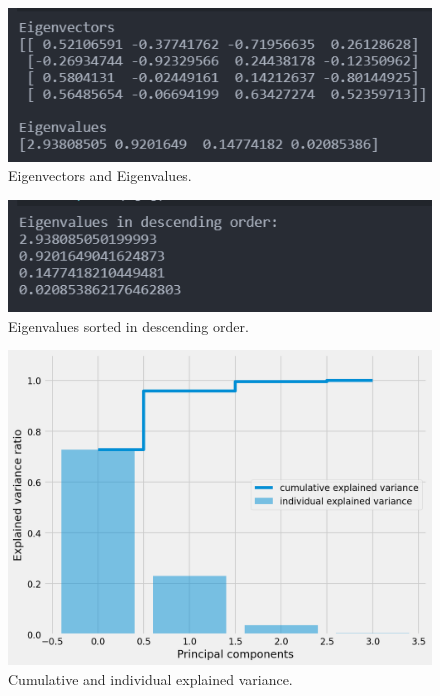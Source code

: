 \documentclass[conference]{IEEEtran}
\begin{document}
\begin{figure}[h]
\centerline{\includegraphics[scale=0.7]{Eval and Evec.png}}
\caption{Eigenvectors and Eigenvalues.}
\label{fig}
\end{figure}

\begin{figure}[h]
\centerline{\includegraphics[scale=0.7]{Ev_sorted.png}}
\caption{Eigenvalues sorted in descending order.}
\label{fig}
\end{figure}

\begin{figure}[h]
\centerline{\includegraphics[scale=0.4]{Variance_exp.png}}
\caption{Cumulative and individual explained variance.}
\label{fig}
\end{figure}
\end{document}
